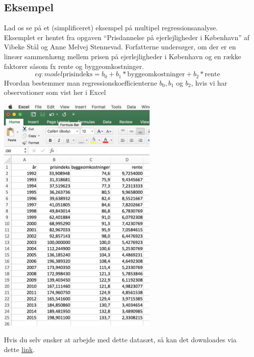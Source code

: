 \subsection{Eksempel}
Lad os se på et (simplificeret) eksempel på multipel regressionsanalyse. Eksemplet er hentet fra opgaven ``Prisdannelse på ejerlejligheder i København'' af Vibeke Stål og Anne Melvej Stennevad. Forfatterne undersøger, om der er en lineær sammenhæng mellem prisen på ejerlejligheder i København og en række faktorer såsom fx rente og byggeomkostninger.
\begin{displaymath}{eq:model}
  \textrm{prisindeks} = b_0 + b_1 * \textrm{byggeomkostninger} + b_2 * \textrm{rente}
\end{displaymath}
Hvordan bestemmer man regressionskoefficienterne \(b_0, b_1\) og \(b_2\), hvis vi har observationer som vist her i Excel
\begin{center}
\includegraphics[height=12cm]{regression/images/data.JPG}
\end{center}
Hvis du selv ønsker at arbejde med dette datasæt, så kan det downloades via dette \href{https://gist.github.com/carsten-j/42595fb16fc646a22bf3f4bec1d81e59/archive/b45e8d1e5e14b83aa16daa652821a8d7b7a3b56d.zip}{link}.

